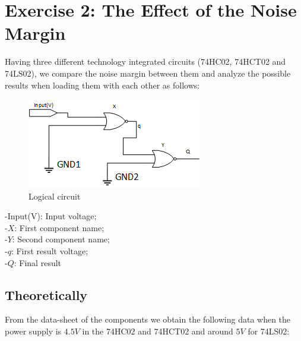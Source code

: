 %

%

%
%
%

\section{\color{olive}Exercise 2: The Effect of the Noise Margin}

Having three different technology integrated circuits (74HC02, 74HCT02 and 74LS02), we compare the noise margin between them and analyze the possible results when loading them with each other as follows:

 \begin{figure}[h!]
        \centering
        \includegraphics[scale=0.65]{../Exercise2/circuit2.png}
        \caption{\color{cyan}Logical circuit}
        \label{fig:ej2circ}
    \end{figure}

-Input(V): Input voltage; \\
-$X$: First component name; \\
-$Y$: Second component name; \\
-$q$: First result voltage; \\
-$Q$: Final result

	\subsection{\color{purple}Theoretically}
	
	 From the data-sheet of the components we obtain the following data when the power supply is $4.5V$ in the 74HC02 and 74HCT02 and around $5V$ for 74LS02:
	 
